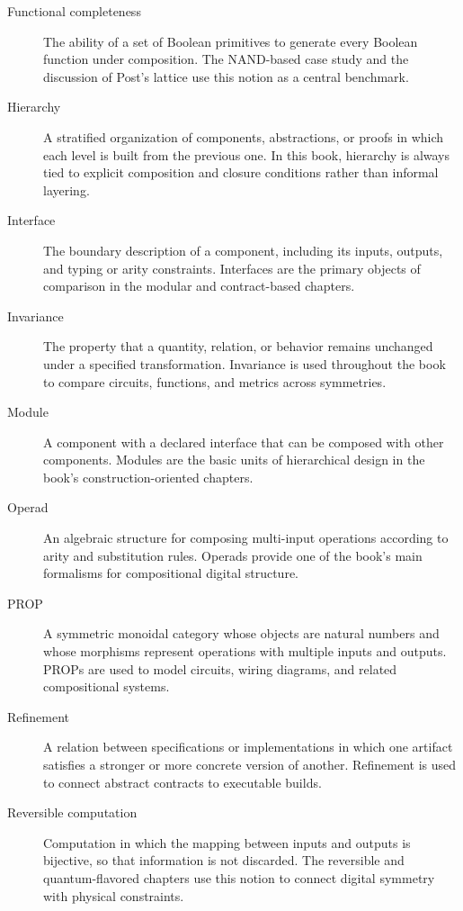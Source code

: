 \documentclass[11pt]{article}
\begin{document}
\begin{description}
  \item[Functional completeness] The ability of a set of Boolean primitives to generate every Boolean function under composition. The NAND-based case study and the discussion of Post's lattice use this notion as a central benchmark.

  \item[Hierarchy] A stratified organization of components, abstractions, or proofs in which each level is built from the previous one. In this book, hierarchy is always tied to explicit composition and closure conditions rather than informal layering.

  \item[Interface] The boundary description of a component, including its inputs, outputs, and typing or arity constraints. Interfaces are the primary objects of comparison in the modular and contract-based chapters.

  \item[Invariance] The property that a quantity, relation, or behavior remains unchanged under a specified transformation. Invariance is used throughout the book to compare circuits, functions, and metrics across symmetries.

  \item[Module] A component with a declared interface that can be composed with other components. Modules are the basic units of hierarchical design in the book's construction-oriented chapters.

  \item[Operad] An algebraic structure for composing multi-input operations according to arity and substitution rules. Operads provide one of the book's main formalisms for compositional digital structure.

  \item[PROP] A symmetric monoidal category whose objects are natural numbers and whose morphisms represent operations with multiple inputs and outputs. PROPs are used to model circuits, wiring diagrams, and related compositional systems.

  \item[Refinement] A relation between specifications or implementations in which one artifact satisfies a stronger or more concrete version of another. Refinement is used to connect abstract contracts to executable builds.

  \item[Reversible computation] Computation in which the mapping between inputs and outputs is bijective, so that information is not discarded. The reversible and quantum-flavored chapters use this notion to connect digital symmetry with physical constraints.


\end{description}
\end{document}
